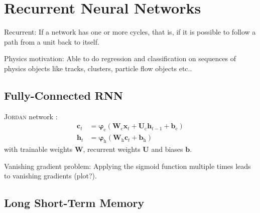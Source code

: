 \section{Recurrent Neural Networks}
\label{sec:rnn}

Recurrent: If a network has one or more cycles, that is, if it is possible to
follow a path from a unit back to itself.

Physics motivation: Able to do regression and classification on sequences of
physics objects like tracks, clusters, particle flow objects etc..

\subsection{Fully-Connected RNN}
\label{sec:fully_connected_rnn}

\textsc{Jordan} network :
\begin{align*}
  \mathbf{c}_t &= \bm{\varphi}_{\text{c}}\left( \mathbf{W}_{\text{c}} \mathbf{x}_{t} + \mathbf{U}_{\text{c}} \mathbf{h}_{t-1} + \mathbf{b}_{\text{c}} \right) \\
  \mathbf{h}_t &= \bm{\varphi}_{\text{h}}\left( \mathbf{W}_{\text{h}} \mathbf{c}_{t} + \mathbf{b}_{\text{h}} \right)
\end{align*}
with trainable weights $\mathbf{W}$, recurrent weights $\mathbf{U}$ and biases $\mathbf{b}$.

Vanishing gradient problem: Applying the sigmoid function multiple times leads
to vanishing gradients (plot?).

\subsection{Long Short-Term Memory}
\label{sec:lstm}

